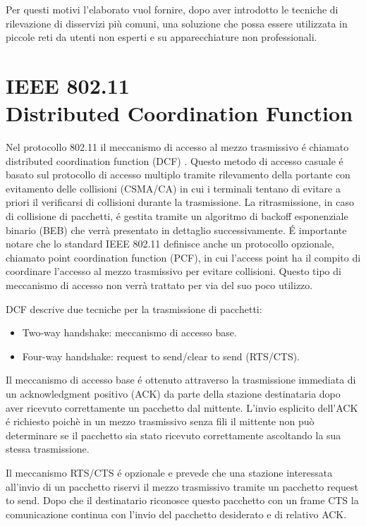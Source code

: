 Per questi motivi l'elaborato vuol fornire, dopo aver introdotto le tecniche di rilevazione di disservizi pi\`u comuni, una soluzione che possa essere utilizzata in piccole reti da utenti non esperti e su apparecchiature non professionali.

\section[IEEE 802.11 Distributed Coordination Function]{IEEE 802.11 \\Distributed Coordination Function}
Nel protocollo 802.11 il meccanismo di accesso al mezzo trasmissivo \'e chiamato distributed coordination function (DCF) \cite{ieee99}.
Questo metodo di accesso casuale \'e basato sul protocollo di accesso multiplo tramite rilevamento della portante con evitamento delle collisioni (CSMA/CA) in cui i terminali tentano di evitare a priori il verificarsi di collisioni durante la trasmissione.
La ritrasmissione, in caso di collisione di pacchetti, \'e gestita tramite un algoritmo di backoff esponenziale binario (BEB) che verr\`a presentato in dettaglio successivamente.
\'E importante notare che lo standard IEEE 802.11 definisce anche un  protocollo opzionale, chiamato point coordination function (PCF), in cui l'access point ha il compito di coordinare l'accesso al mezzo trasmissivo per evitare collisioni. 
Questo tipo di meccanismo di accesso non verr\`a trattato per via del suo poco utilizzo.

DCF descrive due tecniche per la trasmissione di pacchetti:
\begin{itemize}
 \item Two-way handshake: meccanismo di accesso base.
 \item Four-way handshake: request to send/clear to send (RTS/CTS).
\end{itemize}

Il meccanismo di accesso base \'e ottenuto attraverso la trasmissione immediata di un acknowledgment positivo (ACK) da parte della stazione destinataria dopo aver ricevuto correttamente un pacchetto dal mittente.
L'invio esplicito dell'ACK \'e richiesto poich\`e in un mezzo trasmissivo senza fili il mittente non pu\`o determinare se il pacchetto sia stato ricevuto correttamente ascoltando la sua stessa trasmissione.

Il meccanismo RTS/CTS \'e opzionale e prevede che una stazione interessata all'invio di un pacchetto riservi il mezzo trasmissivo tramite un pacchetto request to send.
Dopo che il destinatario riconosce questo pacchetto con un frame CTS la comunicazione continua con l'invio del pacchetto desiderato e di relativo ACK.

